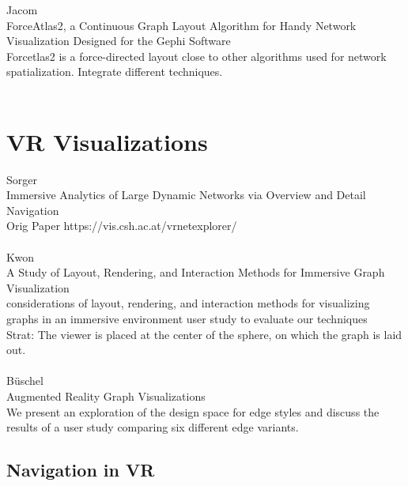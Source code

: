Jacom\\
ForceAtlas2, a Continuous Graph Layout Algorithm for Handy Network Visualization Designed for the Gephi Software\\
Forcetlas2 is a force-directed layout close to other algorithms used for network spatialization. Integrate different techniques.\\
\\

\section{VR Visualizations}

Sorger\\
Immersive Analytics of Large Dynamic Networks via Overview and Detail Navigation\\
Orig Paper https://vis.csh.ac.at/vrnetexplorer/\\
\\
Kwon\\
A Study of Layout, Rendering, and Interaction Methods for Immersive Graph Visualization\\
considerations of layout, rendering, and interaction methods for visualizing graphs in an  immersive environment user study to evaluate our techniques\\
Strat: The viewer is placed at the center of the sphere, on which the graph is laid out.\\
\\
Büschel\\
Augmented Reality Graph Visualizations\\
We present an exploration of the design space for edge styles and discuss the results of a user study comparing six different edge variants.\\

\subsection{Navigation in VR}